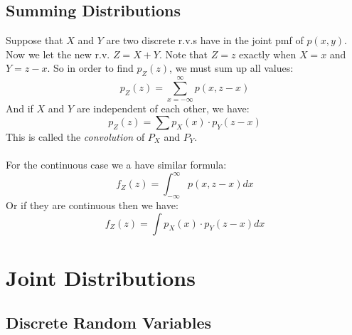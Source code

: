 \documentclass{article}
\begin{document}

\subsection{Summing Distributions}

Suppose that $X$ and $Y$ are two discrete r.v.s have in the joint pmf of $p(x,y)$. Now we let the new r.v. $Z=X+Y$. Note that $Z=z$ exactly when $X=x$ and $Y=z-x$. So in order to find $p_Z(z)$, we must sum up all values:
$$p_Z(z)=\sum_{x=-\infty}^{\infty} p(x,z-x)$$
And if $X$ and $Y$ are independent of each other, we have:
$$p_Z(z)=\sum p_X(x)\cdot p_Y(z-x)$$
This is called the \emph{convolution} of $P_X$ and $P_Y$.
\\\\
For the continuous case we a have similar formula:
$$f_Z(z)=\int_{-\infty}^{\infty}p(x, z-x)dx$$
Or if they are continuous then we have:
$$f_Z(z)=\int p_X(x)\cdot p_Y(z-x)dx$$

\pagebreak

\section{Joint Distributions}

\subsection{Discrete Random Variables}
\end{document}
